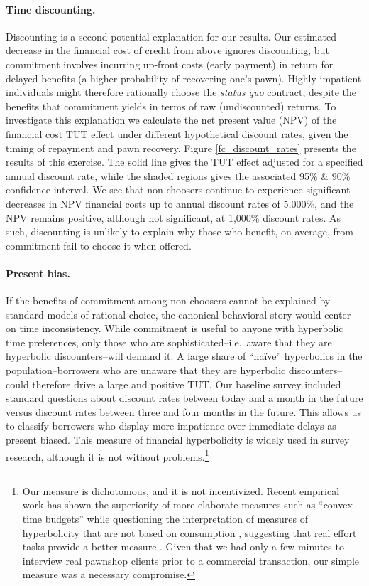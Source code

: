 \documentclass[oneside,11pt]{article}
\begin{document}
\paragraph{Time discounting.} Discounting is a second potential explanation for our results.  Our estimated decrease in the financial cost of credit from above ignores discounting, but commitment involves incurring up-front costs (early payment) in return for delayed benefits (a higher probability of recovering one's pawn).  Highly impatient individuals might therefore rationally choose the \emph{status quo} contract, despite the benefits that commitment yields in terms of raw (undiscounted) returns. To investigate this explanation we calculate the net present value (NPV) of the financial cost $\text{TUT}$ effect under different hypothetical discount rates, given the timing of repayment and pawn recovery. Figure \ref{fc_discount_rates} presents the results of this exercise. 
The solid line gives the TUT effect adjusted for a specified annual discount rate, while the shaded regions gives the associated 95\% \& 90\% confidence interval.
We see that non-choosers continue to experience significant decreases in NPV financial costs up to annual discount rates of 5,000\%, and the NPV remains positive, although not significant, at 1,000\% discount rates.  As such, discounting is unlikely to explain why those who benefit, on average, from commitment fail to choose it when offered. 



\paragraph{Present bias.} If the benefits of commitment among non-choosers cannot be explained by standard models of rational choice, the canonical behavioral story would center on time inconsistency.  While commitment is useful to anyone with hyperbolic time preferences, only those who are sophisticated--i.e.\ aware that they are hyperbolic discounters--will demand it.  A large share of ``na\"ive'' hyperbolics in the population--borrowers who are unaware that they are hyperbolic discounters--could therefore drive a large and positive $\text{TUT}$.  Our baseline survey included standard questions about discount rates between today and a month in the future versus discount rates between three and four months in the future.
This allows us to classify borrowers who display more impatience over immediate delays as present biased. This measure of financial hyperbolicity is widely used in survey research, although it is not without problems.\footnote{Our measure is dichotomous, and it is not incentivized. Recent empirical work has shown the superiority of more elaborate measures such as ``convex time budgets'' \citep{andreoni2015measuring} while questioning the interpretation of measures of hyperbolicity that are not based on consumption \citep{andreoni2012estimating, cohen2020measuring}, suggesting that real effort tasks provide a better measure \citep{augenblick2015working}.  Given that we had only a few minutes to interview real pawnshop clients prior to a commercial transaction, our simple measure was a necessary compromise.}   
\end{document}
